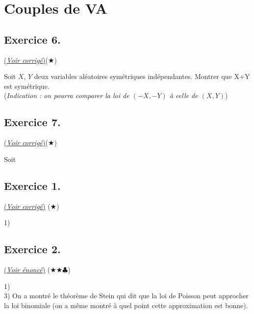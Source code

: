 \documentclass{article}
\makeatletter
\newcommand{\0}{\emptyset}
\newcommand\footnoteref[1]{\protected@xdef\@thefnmark{\ref{#1}}\@footnotemark}
\makeatother
\begin{document}
\section*{Couples de VA}
\subsection*{Exercice 6.}
\hyperref[subsec:corr6]{(\textit{Voir corrigé})}($\bigstar$)
\label{subsec:ex6}
\begin{flushleft}
Soit $X$, $Y$ deux variables aléatoires symétriques \footnoteref{sym} indépendantes. Montrer que X+Y est symétrique.\\
(\textit{Indication : on pourra comparer la loi de $(-X,-Y)$ à celle de $(X,Y)$})\\
\end{flushleft}

\subsection*{Exercice 7.}
\hyperref[subsec:corr7]{(\textit{Voir corrigé})}($\bigstar$)
\label{subsec:ex7}
\begin{flushleft}
Soit 

\end{flushleft}


\newpage


\subsection*{Exercice 1.}
\hyperref[subsec:ex1]{(\textit{Voir corrigé})} ($\bigstar$)
\label{subsec:corr1}
\begin{flushleft}
1)\\
\end{flushleft}


\subsection*{Exercice 2.}
\hyperref[subsec:ex2]{(\textit{Voir énoncé})} ($\bigstar\bigstar\clubsuit$)
\label{subsec:corr2}
\begin{flushleft}
1)\\

3) On a montré le théorème de Stein qui dit que la loi de Poisson peut approcher la loi binomiale (on a même montré à quel point cette approximation est bonne).\\
\end{flushleft}
\end{document}
